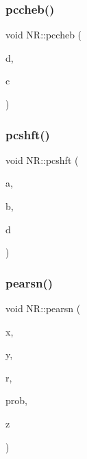 \mbox{\label{namespaceNR_a986417223fa9ced15bc520606386a4db}} 
\subsubsection{\texorpdfstring{pccheb()}{pccheb()}}
{\footnotesize\ttfamily void N\+R\+::pccheb (\begin{DoxyParamCaption}\item[{\mbox{\hyperlink{namespaceNR_a9f943da53862537c552e2a770cb170ae}{Vec\+\_\+\+I\+\_\+\+DP}} \&}]{d,  }\item[{\mbox{\hyperlink{namespaceNR_a970094d23441f8ef6a45282a7eb2103d}{Vec\+\_\+\+O\+\_\+\+DP}} \&}]{c }\end{DoxyParamCaption})}

\mbox{\label{namespaceNR_acbcb308d5c9adf2ac96084b61fff25be}} 
\subsubsection{\texorpdfstring{pcshft()}{pcshft()}}
{\footnotesize\ttfamily void N\+R\+::pcshft (\begin{DoxyParamCaption}\item[{const \mbox{\hyperlink{namespaceNR_af6ff762dd605ff477b8e52387253a02a}{DP}}}]{a,  }\item[{const \mbox{\hyperlink{namespaceNR_af6ff762dd605ff477b8e52387253a02a}{DP}}}]{b,  }\item[{\mbox{\hyperlink{namespaceNR_ab293e06a6bf799d8a7ed932b6852bcb8}{Vec\+\_\+\+I\+O\+\_\+\+DP}} \&}]{d }\end{DoxyParamCaption})}

\mbox{\label{namespaceNR_a08a1c52f699b77be9ca8b79dd29fc143}} 
\subsubsection{\texorpdfstring{pearsn()}{pearsn()}}
{\footnotesize\ttfamily void N\+R\+::pearsn (\begin{DoxyParamCaption}\item[{\mbox{\hyperlink{namespaceNR_a9f943da53862537c552e2a770cb170ae}{Vec\+\_\+\+I\+\_\+\+DP}} \&}]{x,  }\item[{\mbox{\hyperlink{namespaceNR_a9f943da53862537c552e2a770cb170ae}{Vec\+\_\+\+I\+\_\+\+DP}} \&}]{y,  }\item[{\mbox{\hyperlink{namespaceNR_af6ff762dd605ff477b8e52387253a02a}{DP}} \&}]{r,  }\item[{\mbox{\hyperlink{namespaceNR_af6ff762dd605ff477b8e52387253a02a}{DP}} \&}]{prob,  }\item[{\mbox{\hyperlink{namespaceNR_af6ff762dd605ff477b8e52387253a02a}{DP}} \&}]{z }\end{DoxyParamCaption})}

